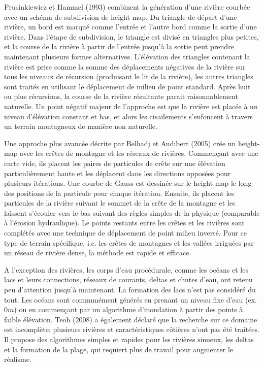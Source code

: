 \documentclass[11pt]{report}
\begin{document}
Prusinkiewicz et Hammel (1993) combinent la génération d'une rivière courbée avec un schéma de subdivision de height-map. Du triangle de départ d'une rivière, un bord est marqué comme l'entrée et l'autre bord comme la sortie d'une rivière. Dans l'étape de subdivision, le triangle est divisé en triangles plus petites, et la course de la rivière à partir de l'entrée jusqu'à la sortie peut prendre maintenant plusieurs formes alternatives. L'élévation des triangles contenant la rivière est prise comme la somme des déplacements négatives de la rivière sur tous les niveaux de récursion (produisant le lit de la rivière), les autres triangles sont traités en utilisant le déplacement de milieu de point standard. Après huit ou plus récursions, la course de la rivière résultante parait raisonnablement naturelle. Un point négatif majeur de l'approche est que la rivière est placée à un niveau d'élévation constant et bas, et alors les cisailements s'enfoncent à travers un terrain montagneux de manière non naturelle. \newline

Une approche plus avancée décrite par Belhadj et Audibert (2005) crée un height-map avec les crêtes de montagne et les réseaux de rivières. Commençant avec une carte vide, ils placent les paires de particules de crête sur une élévation particulièrement haute et les déplacent dans les directions opposées pour plusieurs itérations. Une courbe de Gauss est dessinée sur le height-map le long des positions de la particule pour chaque itération. Ensuite, ils placent les particules de la rivière suivant le sommet de la crête de la montagne et les laissent s'écouler vers le bas suivant des règles simples de la physique (comparable à l'érosion hydraulique). Le points restants entre les crêtes et les rivières sont complétés avec une technique de déplacement de point milieu inversé. Pour ce type de terrain spécifique, i.e. les crêtes de montagnes et les vallées irriguées par un réseau de rivière dense, la méthode est rapide et efficace. \newline
 
 A l'exception des rivières, les corps d'eau procédurale, comme les océans et les lacs et leurs connections, réseaux de courants, deltas et chutes d'eau, ont retenu peu d'attention jusqu'à maintenant. La formation des lacs n'est pas considéré du tout. Les océans sont communément générés en  prenant un niveau fixe d'eau (ex. $0m$) ou en commençant par un algorithme d'inondation à partir des points à faible élévation. Teoh (2008) a également déclaré que la recherche sur ce domaine est incomplète: plusieurs rivières et caractéristiques côtières n'ont pas été traitées. Il propose des algorithmes simples et rapides pour les rivières sinueux, les deltas et la formation de la plage, qui requiert plus de travail pour augmenter le réalisme.
 
\end{document}
